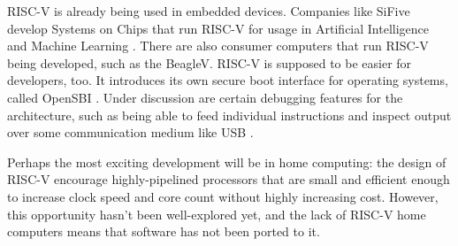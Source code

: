RISC-V is already being used in embedded devices. Companies like SiFive develop
Systems on Chips that run RISC-V for usage in Artificial Intelligence and
Machine Learning \cite{openfive2021soc}. There are also consumer computers that
run RISC-V being developed, such as the BeagleV. RISC-V is supposed to be
easier for developers, too. It introduces its own secure boot interface for
operating systems, called OpenSBI \cite{riscv2021opensbi}. Under discussion are
certain debugging features for the architecture, such as being able to feed
individual instructions and inspect output over some communication medium like
USB \cite{riscv2021debugging}.

Perhaps the most exciting development will be in home computing: the design of
RISC-V encourage highly-pipelined processors that are small and efficient
enough to increase clock speed and core count without highly increasing cost.
However, this opportunity hasn't been well-explored yet, and the lack of RISC-V
home computers means that software has not been ported to it.
